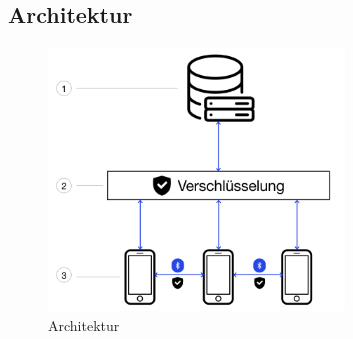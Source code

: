 \documentclass[12pt]{article}
\begin{document}
\subsection{Architektur}

\begin{figure}[H]
    \centering
    \includegraphics[width=0.7\textwidth]{res/architecture}
    \caption{Architektur}
    \label{fig:architecture}
\end{figure}

\begin{thebibliography}{00}
%
%
\end{thebibliography}

%
%
\end{document}
